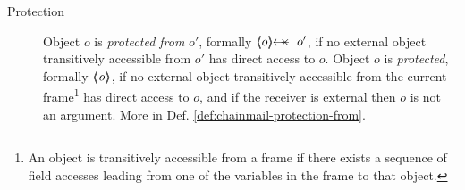  \begin{description}
\item[Protection] 
Object $o$ is \emph{protected  from} $o'$, formally $\protectedFrom {o} {o'}$,  
if no external object transitively accessible from $o'$ has direct access to $o$.
Object $o$ is \emph{protected}, formally ${\langle\!\!\langle \mbox{\normalfont{\texttt{\it{o}}}} \rangle\!\!\rangle}$,  
if no external object transitively accessible from the current frame\footnote{An object is transitively accessible from a frame if 
there exists a sequence of field accesses leading from one of the variables in the frame  to that object.} has direct access to $o$,
 and  if the receiver is external then $o$ is not an argument. 
 More in Def. \ref{def:chainmail-protection-from}. %

 \end{description}
 

